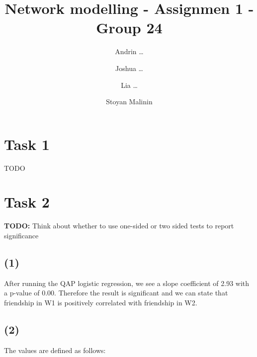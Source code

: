\documentclass[
]{article}
\title{Network modelling - Assignmen 1 - Group 24}
\author{Andrin \ldots{} \and Joshua \ldots{} \and Lia
\ldots{} \and Stoyan Malinin}
\date{}
\newenvironment{Shaded}{\begin{snugshade}}{\end{snugshade}}
\newcommand{\AttributeTok}[1]{\textcolor[rgb]{0.13,0.29,0.53}{#1}}
\newcommand{\CommentTok}[1]{\textcolor[rgb]{0.56,0.35,0.01}{\textit{#1}}}
\newcommand{\ConstantTok}[1]{\textcolor[rgb]{0.56,0.35,0.01}{#1}}
\newcommand{\DecValTok}[1]{\textcolor[rgb]{0.00,0.00,0.81}{#1}}
\newcommand{\FunctionTok}[1]{\textcolor[rgb]{0.13,0.29,0.53}{\textbf{#1}}}
\newcommand{\NormalTok}[1]{#1}
\newcommand{\OtherTok}[1]{\textcolor[rgb]{0.56,0.35,0.01}{#1}}
\newcommand{\SpecialCharTok}[1]{\textcolor[rgb]{0.81,0.36,0.00}{\textbf{#1}}}
\newcommand{\StringTok}[1]{\textcolor[rgb]{0.31,0.60,0.02}{#1}}
\begin{document}
\maketitle

\section{Task 1}\label{task-1}

TODO

\section{Task 2}\label{task-2}

\textbf{TODO:} Think about whether to use one-sided or two sided tests
to report significance

\subsection{(1)}\label{section}

After running the QAP logistic regression, we see a slope coefficient of
2.93 with a p-value of 0.00. Therefore the result is significant and we
can state that friendship in W1 is positively correlated with friendship
in W2.

\subsection{(2)}\label{section-1}

The values are defined as follows:

\begin{Shaded}
\end{Shaded}
\end{document}
